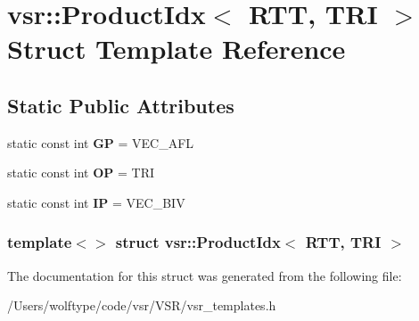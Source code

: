 \hypertarget{structvsr_1_1_product_idx_3_01_r_t_t_00_01_t_r_i_01_4}{\section{vsr\-:\-:Product\-Idx$<$ R\-T\-T, T\-R\-I $>$ Struct Template Reference}
\label{structvsr_1_1_product_idx_3_01_r_t_t_00_01_t_r_i_01_4}
}
\subsection*{Static Public Attributes}
\begin{DoxyCompactItemize}
\item 
\hypertarget{structvsr_1_1_product_idx_3_01_r_t_t_00_01_t_r_i_01_4_acd5dbf9b11acebf5c78157ed229ce228}{static const int {\bfseries G\-P} = V\-E\-C\-\_\-\-A\-F\-L}\label{structvsr_1_1_product_idx_3_01_r_t_t_00_01_t_r_i_01_4_acd5dbf9b11acebf5c78157ed229ce228}

\item 
\hypertarget{structvsr_1_1_product_idx_3_01_r_t_t_00_01_t_r_i_01_4_af1fb9252f1cfa390d0a1495a552e77f6}{static const int {\bfseries O\-P} = T\-R\-I}\label{structvsr_1_1_product_idx_3_01_r_t_t_00_01_t_r_i_01_4_af1fb9252f1cfa390d0a1495a552e77f6}

\item 
\hypertarget{structvsr_1_1_product_idx_3_01_r_t_t_00_01_t_r_i_01_4_a63db48fa57c14aeeb27d10ea28df4aea}{static const int {\bfseries I\-P} = V\-E\-C\-\_\-\-B\-I\-V}\label{structvsr_1_1_product_idx_3_01_r_t_t_00_01_t_r_i_01_4_a63db48fa57c14aeeb27d10ea28df4aea}

\end{DoxyCompactItemize}
\subsubsection*{template$<$$>$ struct vsr\-::\-Product\-Idx$<$ R\-T\-T, T\-R\-I $>$}



The documentation for this struct was generated from the following file\-:\begin{DoxyCompactItemize}
\item 
/\-Users/wolftype/code/vsr/\-V\-S\-R/vsr\-\_\-templates.\-h\end{DoxyCompactItemize}
